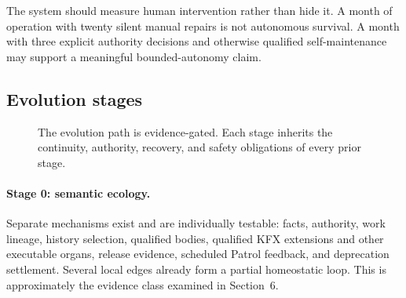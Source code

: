 The system should measure human intervention rather than hide it. A month of
operation with twenty silent manual repairs is not autonomous survival. A
month with three explicit authority decisions and otherwise qualified
self-maintenance may support a meaningful bounded-autonomy claim.

\subsection{Evolution stages}

\begin{figure}[ht]
\centering
{}
\caption{The evolution path is evidence-gated. Each stage inherits the
continuity, authority, recovery, and safety obligations of every prior stage.}
\end{figure}

\paragraph{Stage 0: semantic ecology.}
Separate mechanisms exist and are individually testable: facts, authority,
work lineage, history selection, qualified bodies, qualified KFX extensions
and other executable organs, release evidence, scheduled Patrol feedback, and
deprecation settlement. Several local
edges already form a partial homeostatic loop. This is approximately the
evidence class examined in Section~6.

